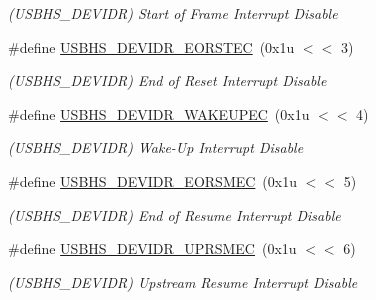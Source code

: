 \begin{DoxyCompactItemize}
\begin{DoxyCompactList}\small\item\em (U\+S\+B\+H\+S\+\_\+\+D\+E\+V\+I\+DR) Start of Frame Interrupt Disable \end{DoxyCompactList}\item 
\mbox{\label{group__SAMV71__USBHS_gac38f7ffa38403f8160b392490c620a18}} 
\#define \mbox{\hyperlink{group__SAMV71__USBHS_gac38f7ffa38403f8160b392490c620a18}{U\+S\+B\+H\+S\+\_\+\+D\+E\+V\+I\+D\+R\+\_\+\+E\+O\+R\+S\+T\+EC}}~(0x1u $<$$<$ 3)
\begin{DoxyCompactList}\small\item\em (U\+S\+B\+H\+S\+\_\+\+D\+E\+V\+I\+DR) End of Reset Interrupt Disable \end{DoxyCompactList}\item 
\mbox{\label{group__SAMV71__USBHS_ga58b300fb668b6a6c4caf00cd36a0dbc8}} 
\#define \mbox{\hyperlink{group__SAMV71__USBHS_ga58b300fb668b6a6c4caf00cd36a0dbc8}{U\+S\+B\+H\+S\+\_\+\+D\+E\+V\+I\+D\+R\+\_\+\+W\+A\+K\+E\+U\+P\+EC}}~(0x1u $<$$<$ 4)
\begin{DoxyCompactList}\small\item\em (U\+S\+B\+H\+S\+\_\+\+D\+E\+V\+I\+DR) Wake-\/\+Up Interrupt Disable \end{DoxyCompactList}\item 
\mbox{\label{group__SAMV71__USBHS_ga70444ef92493dfca180499e8510b2fc7}} 
\#define \mbox{\hyperlink{group__SAMV71__USBHS_ga70444ef92493dfca180499e8510b2fc7}{U\+S\+B\+H\+S\+\_\+\+D\+E\+V\+I\+D\+R\+\_\+\+E\+O\+R\+S\+M\+EC}}~(0x1u $<$$<$ 5)
\begin{DoxyCompactList}\small\item\em (U\+S\+B\+H\+S\+\_\+\+D\+E\+V\+I\+DR) End of Resume Interrupt Disable \end{DoxyCompactList}\item 
\mbox{\label{group__SAMV71__USBHS_ga09aec79ff3dfda039ef5686ca7d1eaa3}} 
\#define \mbox{\hyperlink{group__SAMV71__USBHS_ga09aec79ff3dfda039ef5686ca7d1eaa3}{U\+S\+B\+H\+S\+\_\+\+D\+E\+V\+I\+D\+R\+\_\+\+U\+P\+R\+S\+M\+EC}}~(0x1u $<$$<$ 6)
\begin{DoxyCompactList}\small\item\em (U\+S\+B\+H\+S\+\_\+\+D\+E\+V\+I\+DR) Upstream Resume Interrupt Disable \end{DoxyCompactList}\item 

\end{DoxyCompactItemize}
